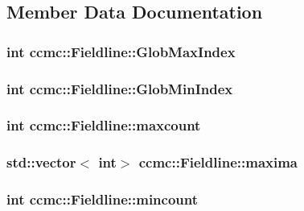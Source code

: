 \subsection{Member Data Documentation}
\hypertarget{classccmc_1_1_fieldline_ab4a42e2d2703418d4d0913ea279e89c1}{
\subsubsection[{Glob\-Max\-Index}]{\setlength{\rightskip}{0pt plus 5cm}int ccmc\-::\-Fieldline\-::\-Glob\-Max\-Index}}\label{classccmc_1_1_fieldline_ab4a42e2d2703418d4d0913ea279e89c1}
\hypertarget{classccmc_1_1_fieldline_a99172cf16d46b155773983b2bfd043dd}{
\subsubsection[{Glob\-Min\-Index}]{\setlength{\rightskip}{0pt plus 5cm}int ccmc\-::\-Fieldline\-::\-Glob\-Min\-Index}}\label{classccmc_1_1_fieldline_a99172cf16d46b155773983b2bfd043dd}
\hypertarget{classccmc_1_1_fieldline_a0d3ae25b1357cec44c7207eb8ecc670d}{
\subsubsection[{maxcount}]{\setlength{\rightskip}{0pt plus 5cm}int ccmc\-::\-Fieldline\-::maxcount}}\label{classccmc_1_1_fieldline_a0d3ae25b1357cec44c7207eb8ecc670d}
\hypertarget{classccmc_1_1_fieldline_afa83761b48fc8782b6bd74a3109881b1}{
\subsubsection[{maxima}]{\setlength{\rightskip}{0pt plus 5cm}std\-::vector$<$ int$>$ ccmc\-::\-Fieldline\-::maxima}}\label{classccmc_1_1_fieldline_afa83761b48fc8782b6bd74a3109881b1}
\hypertarget{classccmc_1_1_fieldline_a2f909b007d4886fa23a7e7281c946274}{
\subsubsection[{mincount}]{\setlength{\rightskip}{0pt plus 5cm}int ccmc\-::\-Fieldline\-::mincount}}\label{classccmc_1_1_fieldline_a2f909b007d4886fa23a7e7281c946274}
